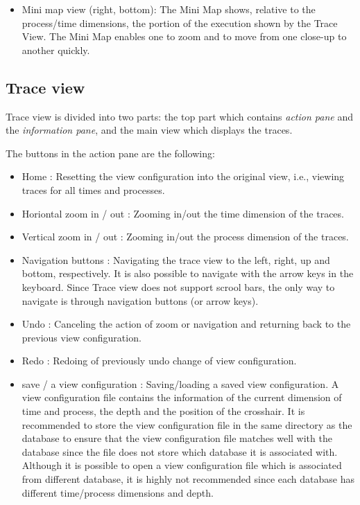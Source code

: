 \documentclass[english]{article}
\begin{document}
\begin{itemize}
\item Mini map view (right, bottom):
  The Mini Map shows, relative to the process/time dimensions, the portion of the execution shown by the Trace View.
  The Mini Map enables one to zoom and to move from one close-up to another quickly.

\end{itemize}



\subsection{Trace view}

Trace view is divided into two parts: the top part which contains \emph{action pane} and the \emph{information pane}, and the main view which displays the traces. 

The buttons in the action pane are the following:
\begin{itemize}

\item Home : Resetting the view configuration into the original view, i.e., viewing traces for all times and processes.
\item Horiontal zoom in / out : Zooming in/out the time dimension of the traces. 
\item Vertical zoom in / out : Zooming in/out the process dimension of the traces.
\item Navigation buttons : Navigating the trace view to the left, right, up and bottom, respectively. It is also possible to navigate with the arrow keys in the keyboard. Since Trace view does not support scrool bars, the only way to navigate is through navigation buttons (or arrow keys).
\item Undo : Canceling the action of zoom or navigation and returning back to the previous view configuration.
\item Redo : Redoing of previously undo change of view configuration.
\item save  / a view configuration : Saving/loading a saved view configuration. 
A view configuration file contains the information of the current dimension of time and process, the depth and the position of the crosshair. 
It is recommended to store the view configuration file in the same directory as the database to ensure that the view configuration file matches well with the database since the file does not store which database it is associated with. 
Although it is possible to open a view configuration file which is associated from different database, it is highly not recommended since each database has different time/process dimensions and depth.


\end{itemize}
\end{document}
